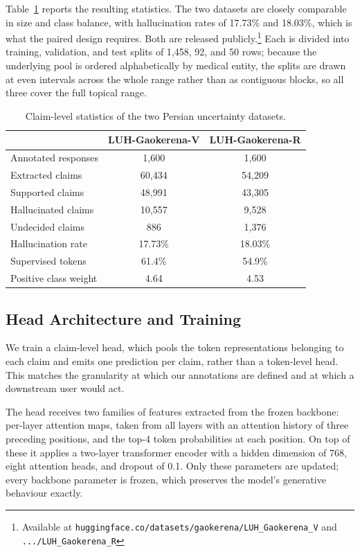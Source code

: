 \documentclass[review]{elsarticle}
\begin{document}
Table~\ref{tab:uhead_datasets} reports the resulting statistics. The two datasets are closely comparable in size and class balance, with hallucination rates of 17.73\% and 18.03\%, which is what the paired design requires. Both are released publicly.\footnote{Available at \texttt{huggingface.co/datasets/gaokerena/LUH\_Gaokerena\_V} and \texttt{.../LUH\_Gaokerena\_R}} Each is divided into training, validation, and test splits of 1{,}458, 92, and 50 rows; because the underlying pool is ordered alphabetically by medical entity, the splits are drawn at even intervals across the whole range rather than as contiguous blocks, so all three cover the full topical range.

\begin{table}[ht]
\centering
\begin{tabular}{|l|c|c|}
\hline
\textbf{} & \textbf{LUH-Gaokerena-V} & \textbf{LUH-Gaokerena-R} \\ \hline
Annotated responses & 1{,}600 & 1{,}600 \\ \hline
Extracted claims & 60{,}434 & 54{,}209 \\ \hline
Supported claims & 48{,}991 & 43{,}305 \\ \hline
Hallucinated claims & 10{,}557 & 9{,}528 \\ \hline
Undecided claims & 886 & 1{,}376 \\ \hline
Hallucination rate & 17.73\% & 18.03\% \\ \hline
Supervised tokens & 61.4\% & 54.9\% \\ \hline
Positive class weight & 4.64 & 4.53 \\ \hline
\end{tabular}
\caption{Claim-level statistics of the two Persian uncertainty datasets.}
\label{tab:uhead_datasets}
\end{table}

\subsection{Head Architecture and Training}

We train a claim-level head, which pools the token representations belonging to each claim and emits one prediction per claim, rather than a token-level head. This matches the granularity at which our annotations are defined and at which a downstream user would act.

The head receives two families of features extracted from the frozen backbone: per-layer attention maps, taken from all layers with an attention history of three preceding positions, and the top-4 token probabilities at each position. On top of these it applies a two-layer transformer encoder with a hidden dimension of 768, eight attention heads, and dropout of 0.1. Only these parameters are updated; every backbone parameter is frozen, which preserves the model's generative behaviour exactly.
\end{document}
